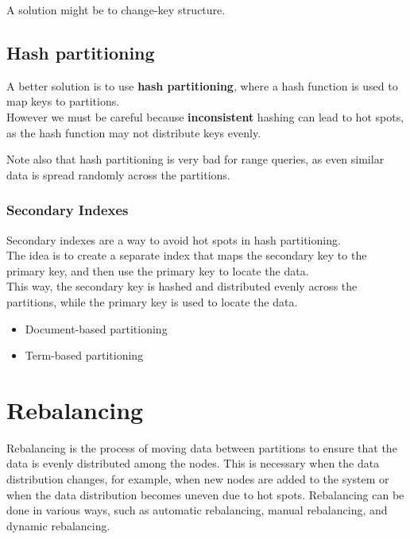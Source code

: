A solution might be to change-key structure.

\subsection{Hash partitioning}
A better solution is to use \textbf{hash partitioning}, where a hash function is used to map keys to partitions.\\
However we must be careful because \textbf{inconsistent} hashing can lead to hot spots, as the hash function may not distribute keys evenly.

Note also that hash partitioning is very bad for range queries, as even similar data is spread randomly across the partitions.

\subsubsection{Secondary Indexes}
Secondary indexes are a way to avoid hot spots in hash partitioning.\\
The idea is to create a separate index that maps the secondary key to the primary key, and then use the primary key to locate the data.\\
This way, the secondary key is hashed and distributed evenly across the partitions, while the primary key is used to locate the data.




\begin{itemize}
   \item Document-based partitioning
   \item Term-based partitioning 
\end{itemize}

\section{Rebalancing}
Rebalancing is the process of moving data between partitions to ensure that the data is evenly distributed among the nodes. This is necessary when the data distribution changes, for example, when new nodes are added to the system or when the data distribution becomes uneven due to hot spots. Rebalancing can be done in various ways, such as automatic rebalancing, manual rebalancing, and dynamic rebalancing.


